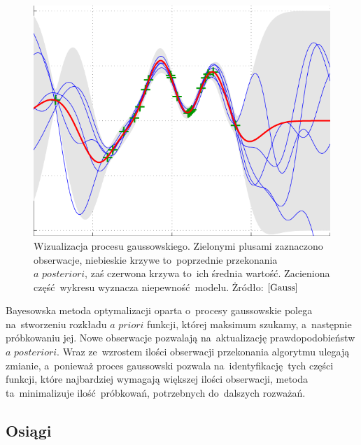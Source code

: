 \documentclass[declaration,shortabstract,inz]{iithesis}
\begin{document}
\begin{figure}[H]
	\centering
	\captionsetup{format=hang}
	\includegraphics[width=\textwidth,height=\textheight,keepaspectratio]{Gauss.png}
	\caption[Caption]{Wizualizacja procesu gaussowskiego. Zielonymi plusami zaznaczono obserwacje, niebieskie krzywe to~poprzednie przekonania $\textit{a posteriori}$, zaś czerwona krzywa to~ich średnia wartość. Zacieniona część wykresu wyznacza niepewność modelu. Żródło: $\cite{Gauss}$}
	\label{fig:Gauss}
\end{figure}

Bayesowska metoda optymalizacji oparta o~procesy gaussowskie polega na~stworzeniu rozkładu $\textit{a priori}$ funkcji, której maksimum szukamy, a~następnie próbkowaniu jej. Nowe obserwacje pozwalają na~aktualizację prawdopodobieństw $\textit{a posteriori}$. Wraz ze~wzrostem ilości obserwacji przekonania algorytmu ulegają zmianie, a~ponieważ proces gaussowski pozwala na~identyfikację tych części funkcji, które najbardziej wymagają większej ilości obserwacji, metoda ta~minimalizuje ilość próbkowań, potrzebnych do~dalszych rozważań.

\subsection*{Osiągi}
\end{document}
